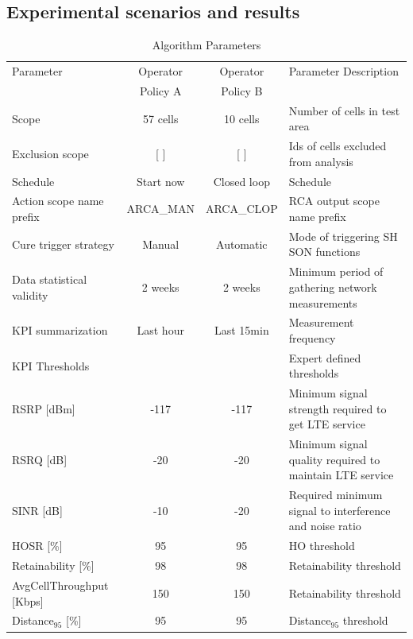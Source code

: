 \documentclass[conference]{IEEEtran}
\begin{document}
\subsection{Experimental scenarios and results}
\label{results}





\begin{table}[!t]
\renewcommand{\arraystretch}{1.3}

\caption{Algorithm Parameters}
\label{Algorithm_Parameters}
\centering

\begin{tabular}{@{}lccl@{}}
\hline
Parameter &Operator &Operator &Parameter Description\\
&Policy A&Policy B&\\
\hline
Scope  & 57 cells  & 10 cells& Number of cells in test area \\
Exclusion scope  & [ ]   &  [ ] & Ids of cells excluded from analysis \\
Schedule&	Start now & Closed loop	&Schedule	\\			 Action scope name prefix &ARCA\_MAN	&ARCA\_CLOP	& RCA output scope name prefix\\		Cure trigger strategy &	Manual &Automatic	&Mode of triggering SH SON functions	\\									
Data statistical validity&	2 weeks&2 weeks& Minimum period of gathering network measurements	\\
KPI summarization&	Last hour &Last 15min&Measurement frequency	\\\hline
KPI Thresholds&	 && Expert defined thresholds	\\\hline
RSRP [dBm]&	-117& 	-117&Minimum signal strength required to get LTE service\\
RSRQ [dB]&	-20& 	-20&Minimum signal quality required to maintain LTE service\\
SINR [dB]&	-10& 	-20& Required minimum signal to  interference  and noise ratio \\
HOSR [\%]&	95& 	95&  HO threshold \\
Retainability [\%]&	98& 	98&  Retainability threshold \\
AvgCellThroughput [Kbps]&	150& 	150&  Retainability threshold \\
Distance$_{95}$ [\%]&	95& 	95&  Distance$_{95}$ threshold \\\hline


\end{tabular}
\end{table}
\end{document}
